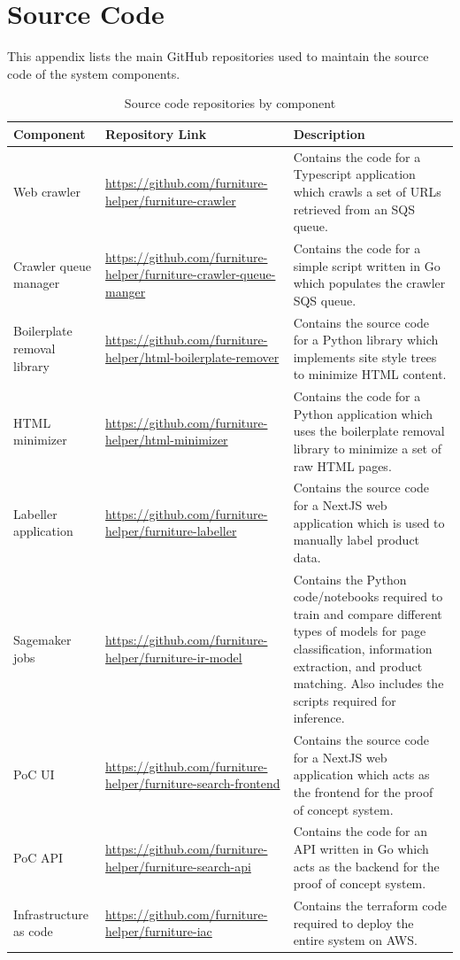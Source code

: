 \chapter{Source Code}\label{app:source_code}

This appendix lists the main GitHub repositories used to maintain the source code of the system components.

\begin{table}[H]
    \centering
    \small
    \renewcommand{\arraystretch}{1.2}
    \begin{tabularx}{\textwidth}{p{3.3cm} X X}
        \toprule
        \textbf{Component} & \textbf{Repository Link} & \textbf{Description} \\
        \midrule
        Web crawler & \url{https://github.com/furniture-helper/furniture-crawler} & Contains the code for a Typescript application which crawls a set of URLs retrieved from an SQS queue. \\
        Crawler queue manager & \url{https://github.com/furniture-helper/furniture-crawler-queue-manger} & Contains the code for a simple script written in Go which populates the crawler SQS queue. \\
        Boilerplate removal library & \url{https://github.com/furniture-helper/html-boilerplate-remover} & Contains the source code for a Python library which implements site style trees to minimize HTML content. \\
        HTML minimizer & \url{https://github.com/furniture-helper/html-minimizer} & Contains the code for a Python application which uses the boilerplate removal library to minimize a set of raw HTML pages. \\
        Labeller application & \url{https://github.com/furniture-helper/furniture-labeller} & Contains the source code for a NextJS web application which is used to manually label product data. \\
        Sagemaker jobs & \url{https://github.com/furniture-helper/furniture-ir-model} & Contains the Python code/notebooks required to train and compare different types of models for page classification, information extraction, and product matching. Also includes the scripts required for inference. \\
        PoC UI & \url{https://github.com/furniture-helper/furniture-search-frontend} & Contains the source code for a NextJS web application which acts as the frontend for the proof of concept system. \\
        PoC API & \url{https://github.com/furniture-helper/furniture-search-api} & Contains the code for an API written in Go which acts as the backend for the proof of concept system. \\
        Infrastructure as code & \url{https://github.com/furniture-helper/furniture-iac} & Contains the terraform code required to deploy the entire system on AWS. \\
        \bottomrule
    \end{tabularx}
    \caption{Source code repositories by component}
    \label{tab:source-code-repositories}
\end{table}
